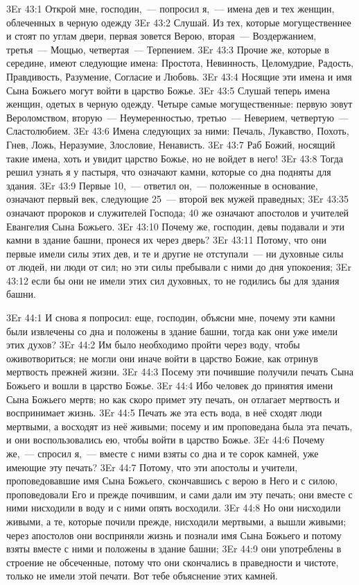 \vs 3Er 43:1
Открой мне, господин,~--- попросил я,~--- имена дев и тех женщин, облеченных в черную одежду
\vs 3Er 43:2
Слушай. Из тех, которые
могущественнее и стоят по углам двери, первая зовется Верою, вторая~--- Воздержанием, третья~--- Мощью, четвертая~--- Терпением.
\vs 3Er 43:3
Прочие же, которые в
середине, имеют следующие имена: Простота, Невинность, Целомудрие, Радость,
Правдивость, Разумение, Согласие и Любовь.
\vs 3Er 43:4
Носящие эти имена и имя
Сына Божьего могут войти в царство Божье.
\vs 3Er 43:5
Слушай теперь имена
женщин, одетых в черную одежду. Четыре самые могущественные: первую зовут
Вероломством, вторую~--- Неумеренностью, третью~--- Неверием,
четвертую~--- Сластолюбием.
\vs 3Er 43:6
Имена следующих за ними:
Печаль, Лукавство, Похоть, Гнев, Ложь, Неразумие, Злословие, Ненависть.
\vs 3Er 43:7
Раб Божий, носящий такие
имена, хоть и увидит царство Божье, но не войдет в него!
\vs 3Er 43:8
Тогда решил узнать я у
пастыря, что означают камни, которые со дна подняты для здания.
\vs 3Er 43:9
Первые 10,~--- ответил он,~--- положенные в основание,
означают первый век,
следующие 25~--- второй век мужей праведных;
\vs 3Er 43:35
означают пророков и служителей
Господа; 40 же означают апостолов и учителей Евангелия Сына Божьего.
\vs 3Er 43:10
Почему же, господин, девы
подавали и эти камни в здание башни, пронеся их через дверь?
\vs 3Er 43:11
Потому, что они первые
имели силы этих дев, и те и другие не отступали~--- ни духовные силы от людей,
ни люди от сил; но эти силы пребывали с ними до дня упокоения;
\vs 3Er 43:12
если бы они не имели этих
сил духовных, то не годились бы для здания башни.

\vs 3Er 44:1
И снова я попросил: еще,
господин, объясни мне, почему эти камни были извлечены со дна и положены в
здание башни, тогда как они уже имели этих духов?
\vs 3Er 44:2
Им было необходимо пройти
через воду, чтобы оживотвориться; не могли они иначе войти в царство Божие,
как отринув мертвость прежней жизни.
\vs 3Er 44:3
Посему эти почившие
получили печать Сына Божьего и вошли в царство Божье.
\vs 3Er 44:4
Ибо человек до принятия
имени Сына Божьего мертв; но как скоро примет эту печать, он отлагает
мертвость и воспринимает жизнь.
\vs 3Er 44:5
Печать же эта есть вода, в
неё сходят люди мертвыми, а восходят из неё живыми; посему и им проповедана
была эта печать, и они воспользовались ею, чтобы войти в царство Божье.
\vs 3Er 44:6
Почему же,~--- спросил я,~--- вместе с ними взяты со дна и те сорок камней, уже имеющие эту печать?
\vs 3Er 44:7
Потому, что эти апостолы и
учители, проповедовавшие имя Сына Божьего, скончавшись с верою в Него и с
силою, проповедовали Его и прежде почившим, и сами дали им эту печать; они
вместе с ними нисходили в воду и с ними опять восходили.
\vs 3Er 44:8
Но они нисходили живыми, а
те, которые почили прежде, нисходили мертвыми, а вышли живыми; через апостолов
они восприняли жизнь и познали имя Сына Божьего и потому взяты вместе с ними и
положены в здание башни;
\vs 3Er 44:9
они употреблены в строение
не обсеченные, потому что они скончались в праведности и чистоте, только не
имели этой печати. Вот тебе объяснение этих камней.

